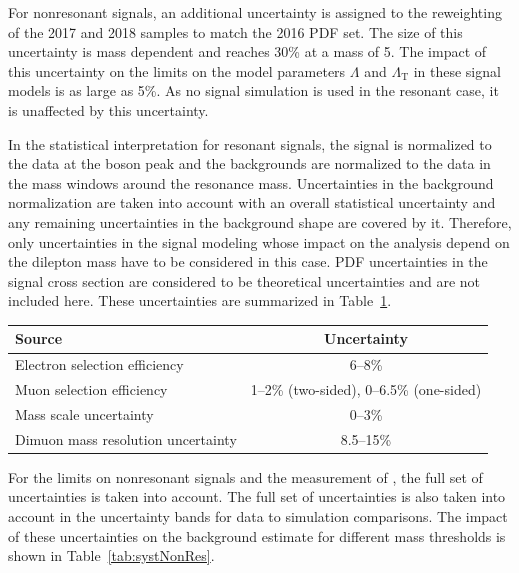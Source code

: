\documentclass[11pt,twoside,a4paper,cmspaper,final,collab]{cms-tdr}
\begin{document}
For nonresonant signals, an additional uncertainty is assigned to the reweighting of the 2017 and 2018 samples to match the 2016 PDF set. The size of this uncertainty is mass dependent and reaches 30\% at a mass of 5\TeV. The impact of this uncertainty on the limits on the model parameters $\Lambda$ and $\Lambda_{\mathrm{T}}$ in these signal models is  as large as 5\%. As no signal simulation is used in the resonant case, it is unaffected by this uncertainty.

In the statistical interpretation for resonant signals, the signal is normalized to the data at the \PZ boson peak and the backgrounds are normalized to the data in the mass windows around the resonance mass. Uncertainties in the background normalization are taken into account with an overall statistical uncertainty and any remaining uncertainties in the background shape are covered by it. Therefore, only uncertainties in the signal modeling whose impact on the analysis depend on the dilepton mass have to be considered in this case. PDF uncertainties in the signal cross section are considered to be theoretical uncertainties and are not included here. These uncertainties are summarized in Table~\ref{tab:syst}.

\begin{table}[!htb]
\centering
{}
\centering
\begin{tabular}{lc}
\hline
Source & Uncertainty \\\hline 
Electron selection efficiency & 6--8\%\\
Muon selection efficiency &1--2\% (two-sided), 0--6.5\% (one-sided)\\
Mass scale uncertainty & 0--3\%\\
Dimuon mass resolution uncertainty & 8.5--15\%\\
\hline
\end{tabular}
\label{tab:syst}
\end{table}

For the limits on nonresonant signals and the measurement of \Rmumuee, the full set of uncertainties is taken into account. The full set of uncertainties is also taken into account in the uncertainty bands for data to simulation comparisons. The impact of these uncertainties on the background estimate for different mass thresholds is shown in Table~\ref{tab:systNonRes}.
\end{document}
